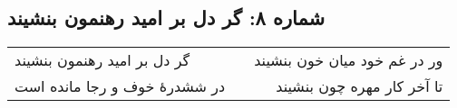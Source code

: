 \begin{center}
\section*{شماره ۸: گر دل بر امید رهنمون بنشیند}
\label{sec:008}
\begin{longtable}{l p{0.5cm} r}
گر دل بر امید رهنمون بنشیند
&&
ور در غم خود میان خون بنشیند
\\
در ششدرهٔ خوف و رجا مانده است
&&
تا آخر کار مهره چون بنشیند
\\
\end{longtable}
\end{center}
